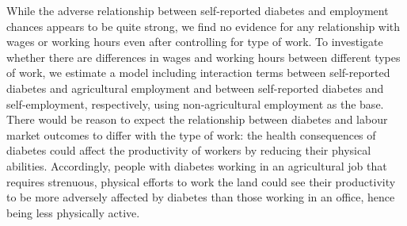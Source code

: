 While the adverse relationship between self-reported diabetes and
employment chances appears to be quite strong, we find no evidence
for any relationship with wages or working hours even after controlling
for type of work. To investigate whether there are differences in
wages and working hours between different types of work, we estimate
a model including interaction terms between self-reported diabetes
and agricultural employment and between self-reported diabetes and
self-employment, respectively, using non-agricultural employment as
the base. There would be reason to expect the relationship between
diabetes and labour market outcomes to differ with the type of work:
the health consequences of diabetes could affect the productivity
of workers by reducing their physical abilities. Accordingly, people
with diabetes working in an agricultural job that requires strenuous,
physical efforts to work the land could see their productivity to be
more adversely affected by diabetes than those working in an office,
hence being less physically active. 

